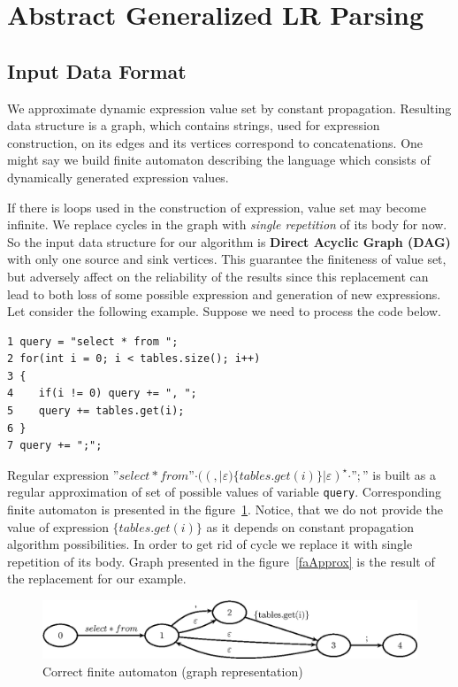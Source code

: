 \documentclass{sigplanconf}
\begin{document}
\section{Abstract Generalized LR Parsing}
\subsection{Input Data Format}

We approximate dynamic expression value set by constant propagation. Resulting data structure is a graph, which contains strings, used for expression construction, on its edges and its vertices correspond to concatenations. One might say we build finite automaton describing the language which consists of dynamically generated expression values.
	
If there is loops used in the construction of expression, value set may become infinite. We replace cycles in the graph with {\it single repetition} of its body for now. So the input data structure for our algorithm is {\bf Direct Acyclic Graph (DAG)} with only one source and sink vertices. This guarantee the finiteness of value set, but adversely affect on the reliability of the results since this replacement can lead to both loss of some possible expression and generation of new expressions. Let consider the following example. Suppose we need to process the code below.

\begin{verbatim}
1 query = "select * from ";
2 for(int i = 0; i < tables.size(); i++)
3 {
4    if(i != 0) query += ", ";
5    query += tables.get(i);
6 }
7 query += ";";
\end{verbatim}

	Regular expression $”select * from ” \cdot ((,|\varepsilon)\{tables.get(i)\}|\varepsilon)^{\star} \cdot ”;”$ is built as a regular approximation of set of possible values of variable \verb|query|. Corresponding finite automaton is presented in the figure~\ref{fa}. Notice, that we do not provide the value of expression $\{tables.get(i)\}$ as it depends on constant propagation algorithm possibilities. In order to get rid of cycle we replace it with single repetition of its body. Graph presented in the figure~\ref{faApprox} is the result of the replacement for our example.



\begin{figure}[h!]
    \begin{center}
        \includegraphics[scale=0.5]{Graphs/cyclesOrig.eps}
    \end{center}
    \caption{Correct finite automaton (graph representation)}
    \label{fa}
\end{figure}
\end{document}
